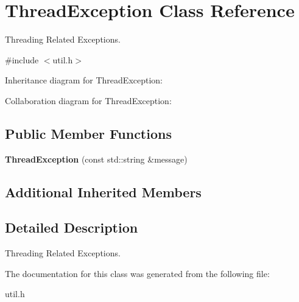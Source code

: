 \hypertarget{classThreadException}{}\section{Thread\+Exception Class Reference}
\label{classThreadException}


Threading Related Exceptions.  




{\ttfamily \#include $<$util.\+h$>$}



Inheritance diagram for Thread\+Exception\+:


Collaboration diagram for Thread\+Exception\+:
\subsection*{Public Member Functions}
\begin{DoxyCompactItemize}
\item 
\mbox{\label{classThreadException_aecb9809147f30230ce13bd8c611b1bc5}} 
{\bfseries Thread\+Exception} (const std\+::string \&message)
\end{DoxyCompactItemize}
\subsection*{Additional Inherited Members}


\subsection{Detailed Description}
Threading Related Exceptions. 

The documentation for this class was generated from the following file\+:\begin{DoxyCompactItemize}
\item 
util.\+h\end{DoxyCompactItemize}
